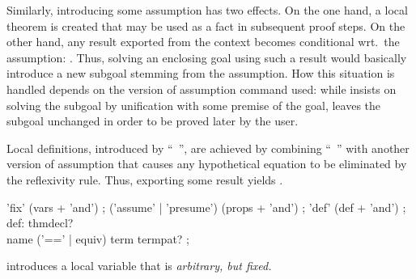 \begin{isabellebody}
\begin{isamarkuptext}
  Similarly, introducing some assumption \isa{{\isasymchi}} has two effects.
  On the one hand, a local theorem is created that may be used as a
  fact in subsequent proof steps.  On the other hand, any result
  \isa{{\isachardoublequote}{\isasymchi}\ {\isasymturnstile}\ {\isasymphi}{\isachardoublequote}} exported from the context becomes conditional wrt.\
  the assumption: \isa{{\isachardoublequote}{\isasymturnstile}\ {\isasymchi}\ {\isasymLongrightarrow}\ {\isasymphi}{\isachardoublequote}}.  Thus, solving an enclosing goal
  using such a result would basically introduce a new subgoal stemming
  from the assumption.  How this situation is handled depends on the
  version of assumption command used: while \hyperlink{command.assume}{\mbox{}}
  insists on solving the subgoal by unification with some premise of
  the goal, \hyperlink{command.presume}{\mbox{}} leaves the subgoal unchanged in order
  to be proved later by the user.

  Local definitions, introduced by ``\hyperlink{command.def}{\mbox{}}~'', are achieved by combining ``\hyperlink{command.fix}{\mbox{}}~'' with
  another version of assumption that causes any hypothetical equation
  \isa{{\isachardoublequote}x\ {\isasymequiv}\ t{\isachardoublequote}} to be eliminated by the reflexivity rule.  Thus,
  exporting some result  yields .

  \begin{rail}
    'fix' (vars + 'and')
    ;
    ('assume' | 'presume') (props + 'and')
    ;
    'def' (def + 'and')
    ;
    def: thmdecl? \\ name ('==' | equiv) term termpat?
    ;
  \end{rail}

  \begin{descr}
  
  \item [\hyperlink{command.fix}{\mbox{\isa{\isacommand{fix}}}}~] introduces a local variable
  \isa{x} that is \emph{arbitrary, but fixed.}
  

\end{descr}
\end{isamarkuptext}
\end{isabellebody}
